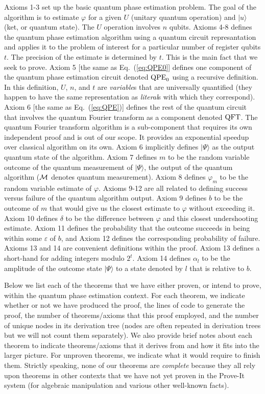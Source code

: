 \documentclass{article}[12pt]
\begin{document}
Axioms 1-3 set up the basic quantum phase estimation problem.  The goal of the algorithm is to estimate $\varphi$ for a given $U$ (unitary quantum operation) and $\lvert u \rangle$ (ket, or quantum state).  The $U$ operation involves $n$ qubits.  Axioms 4-8 defines the quantum phase estimation algorithm using a quantum circuit represantation and applies it to the problem of interest for a particular number of register qubits $t$.  The precision of the estimate is determined by $t$.  This is the main fact that we seek to prove.  Axiom 5 [the same as Eq.~(\ref{eq:QPE0}] defines one component of the quantum phase estimation circuit denoted ${\rm QPE}_0$ using a recursive definition.  In this definition, $U$, $n$, and $t$ are {\em variable}s that are universally quantified (they happen to have the same representation as {\em literal}s with which they correspond).  Axiom 6 [the same as Eq.~(\ref{eq:QPE})] defines the rest of the quantum circuit that involves the quantum Fourier transform as a component denoted ${\rm QFT}$.  The quantum Fourier transform algorithm is a sub-component that requires its own independent proof and is out of our scope.  It provides an exponential speedup over classical algorithm on its own.  Axiom 6 implicitly defines $\lvert \Psi \rangle$ as the output quantum state of the algorithm.
Axiom 7 defines $m$ to be the random variable outcome of the quantum measurement of $\lvert \Psi \rangle$, the output of the quantum algorithm (${\cal M}$ denotes quantum measurement).  Axiom 8 defines $\varphi_m$ to be the random variable estimate of $\varphi$.  Axioms 9-12 are all related to defining success versus failure of the quantum algorithm output.  Axiom 9 defines $b$ to be the outcome of $m$ that would give us the closest estimate to $\varphi$ without exceeding it.  Axiom 10 defines $\delta$ to be the difference between $\varphi$ and this closest undershooting estimate.  Axiom 11 defines the probability that the outcome succeeds in being within some $\varepsilon$ of $b$, and Axiom 12 defines the corresponding probability of failure.  Axioms 13 and 14 are convenient definitions within the proof.  Axiom 13 defines a short-hand for adding integers modulo $2^t$.  Axiom 14 defines $\alpha_l$ to be the amplitude of the outcome state $\vert \Psi \rangle$ to a state denoted by $l$ that is relative to $b$.

Below we list each of the theorems that we have either proven, or intend to prove, within the quantum phase estimation context.  For each theorem, we indicate whether or not we have produced the proof, the lines of code to generate the proof, the number of theorems/axioms that this proof employed, and the number of unique nodes in its derivation tree (nodes are often repeated in derivation trees but we will not count them separately).  We also provide brief notes about each theorem to indicate theorems/axioms that it derives from and how it fits into the larger picture.  For unproven theorems, we indicate what it would require to finish them.  Strictly speaking, none of our theorems are {\em complete} because they all rely upon theorems in other contexts that we have not yet proven in the Prove-It system (for algebraic manipulation and various other well-known facts).
\end{document}

